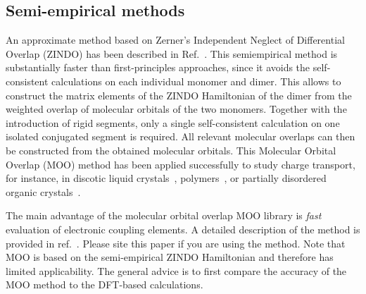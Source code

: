 \subsection{Semi-empirical methods}
\label{sec:moo}

\newcommand{\moo}{MOO\xspace}

An approximate method based on Zerner's Independent Neglect of Differential Overlap (ZINDO) has been described in Ref.~\cite{kirkpatrick_approximate_2008}. This semiempirical method is substantially faster than first-principles approaches, since it avoids the self-consistent calculations on each individual monomer and dimer. This allows to construct the matrix elements of the ZINDO Hamiltonian of the dimer from
the weighted overlap of molecular orbitals of the two monomers. Together with the introduction of rigid segments, only a single self-consistent calculation on one isolated conjugated segment is required. All relevant molecular overlaps can then be constructed from the obtained molecular orbitals. This Molecular Orbital Overlap (MOO) method has been applied successfully to study charge transport, for instance, in discotic liquid crystals~\cite{kirkpatrick_columnar_2008,marcon_understanding_2009,feng_towards_2009},
polymers~\cite{ruehle_multiscale_2010}, or partially disordered organic crystals~\cite{vehoff_charge_2010-1,vehoff_charge_2010-2,vehoff_charge_2010}.

The main advantage of the molecular orbital overlap \moo library is {\em fast} evaluation of electronic coupling elements. A detailed description of the method is provided in ref.~\cite{kirkpatrick_approximate_2008}. Please site this paper if you are using the method. Note that \moo is based on the semi-empirical ZINDO Hamiltonian and therefore has limited applicability. The general advice is to first compare the accuracy of the \moo method to the DFT-based calculations. 

